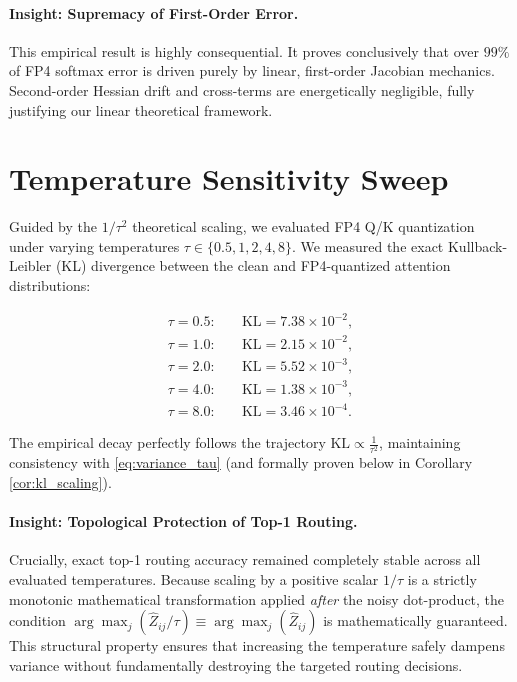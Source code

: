 \paragraph{Insight: Supremacy of First-Order Error.}
This empirical result is highly consequential. It proves conclusively that over $99\%$ of FP4 softmax error is driven purely by linear, first-order Jacobian mechanics. Second-order Hessian drift and cross-terms are energetically negligible, fully justifying our linear theoretical framework.

\section{Temperature Sensitivity Sweep}
\label{sec:temp_sweep}

Guided by the $1/\tau^2$ theoretical scaling, we evaluated FP4 Q/K quantization under varying temperatures $\tau \in \{0.5, 1, 2, 4, 8\}$. We measured the exact Kullback-Leibler (KL) divergence between the clean and FP4-quantized attention distributions:

\begin{align*}
\tau=0.5:& \quad \mathrm{KL}=7.38 \times 10^{-2}, \\
\tau=1.0:& \quad \mathrm{KL}=2.15 \times 10^{-2}, \\
\tau=2.0:& \quad \mathrm{KL}=5.52 \times 10^{-3}, \\
\tau=4.0:& \quad \mathrm{KL}=1.38 \times 10^{-3}, \\
\tau=8.0:& \quad \mathrm{KL}=3.46 \times 10^{-4}.
\end{align*}

The empirical decay perfectly follows the trajectory $\mathrm{KL} \propto \frac{1}{\tau^2}$, maintaining consistency with \eqref{eq:variance_tau} (and formally proven below in Corollary \ref{cor:kl_scaling}). 

\paragraph{Insight: Topological Protection of Top-1 Routing.}
Crucially, exact top-1 routing accuracy remained completely stable across all evaluated temperatures. Because scaling by a positive scalar $1/\tau$ is a strictly monotonic mathematical transformation applied \textit{after} the noisy dot-product, the condition $\arg\max_j (\widehat{Z}_{ij}/\tau) \equiv \arg\max_j (\widehat{Z}_{ij})$ is mathematically guaranteed. This structural property ensures that increasing the temperature safely dampens variance without fundamentally destroying the targeted routing decisions.

